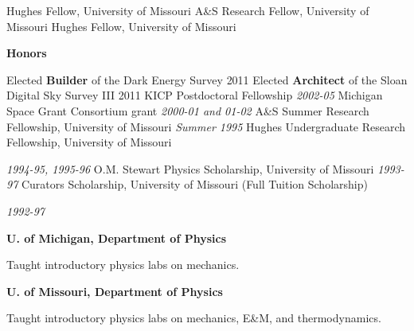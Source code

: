 \documentclass[12pt]{article}
\begin{document}
	\hfill
\newline
\makebox[1.25in][l]{}
	{Hughes Fellow, University of Missouri}
	\hfill
\newline
\makebox[1.25in][l]{}
	{A\&S Research Fellow, University of Missouri}
	\hfill
\newline
\makebox[1.25in][l]{}
	{Hughes Fellow, University of Missouri}
	\hfill

\ssp
\ssp
\noindent
\parbox[l]{1.25in}{{\bf Honors}}
\parbox[t]{5.40in}{
Elected {\bf Builder} of the Dark Energy Survey \hfill {\small 2011} \newline
Elected {\bf Architect} of the Sloan Digital Sky Survey III \hfill {\small 2011} \newline
KICP Postdoctoral Fellowship \hfill {\small \it 2002-05} \newline
Michigan Space Grant Consortium grant  \hfill 
       {\small \it 2000-01 and 01-02 }\newline
A\&S Summer Research Fellowship, University of Missouri \hfill 
       {\small \it Summer 1995}\newline
Hughes Undergraduate Research Fellowship, University of
       Missouri  
	   
	   \hfill {\small \it 1994-95, 1995-96}\newline
O.M. Stewart Physics Scholarship, University
       of Missouri \hfill {\small \it 1993-97}\newline
Curators Scholarship, University of Missouri 
       (Full Tuition Scholarship) 
	   
	   \hfill {\small \it 1992-97}
}

\newpage
\ssp
\ssp
\noindent
{}
{{\bf U. of Michigan, Department of Physics}}
\hfill
{}

\noindent
\makebox[1.25in][l]{}
\parbox[t]{5.40in}{Taught introductory physics labs on mechanics.}

\ssp
\noindent
\makebox[1.25in][l]{}
{{\bf U. of Missouri, Department of Physics}}
\hfill
{}

\noindent
\makebox[1.25in][l]{}
\parbox[t]{5.40in}{Taught introductory physics labs on mechanics, E\&M, and thermodynamics.}
\end{document}
